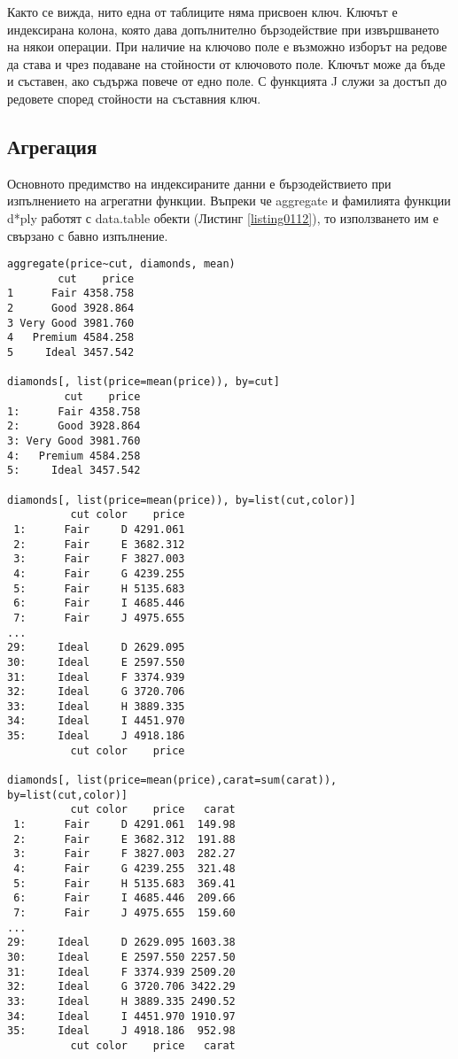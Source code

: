 Както се вижда, нито една от таблиците няма присвоен ключ. Ключът е индексирана колона, която дава допълнително бързодействие при извършването на някои операции. При наличие на ключово поле е възможно изборът на редове да става и чрез подаване на стойности от ключовото поле. Ключът може да бъде и съставен, ако съдържа повече от едно поле. С функцията J служи за достъп до редовете според стойности на съставния ключ. 

\subsection{Агрегация}

Основното предимство на индексираните данни е бързодействието при изпълнението на агрегатни функции. Въпреки че aggregate и фамилията функции d*ply работят с data.table обекти (Листинг \ref{listing0112}), то използването им е свързано с бавно изпълнение. 

\begin{lstlisting}[caption=Агрегатни функции, label=listing0112]
aggregate(price~cut, diamonds, mean)
        cut    price
1      Fair 4358.758
2      Good 3928.864
3 Very Good 3981.760
4   Premium 4584.258
5     Ideal 3457.542

diamonds[, list(price=mean(price)), by=cut]
         cut    price
1:      Fair 4358.758
2:      Good 3928.864
3: Very Good 3981.760
4:   Premium 4584.258
5:     Ideal 3457.542

diamonds[, list(price=mean(price)), by=list(cut,color)]
          cut color    price
 1:      Fair     D 4291.061
 2:      Fair     E 3682.312
 3:      Fair     F 3827.003
 4:      Fair     G 4239.255
 5:      Fair     H 5135.683
 6:      Fair     I 4685.446
 7:      Fair     J 4975.655
...
29:     Ideal     D 2629.095
30:     Ideal     E 2597.550
31:     Ideal     F 3374.939
32:     Ideal     G 3720.706
33:     Ideal     H 3889.335
34:     Ideal     I 4451.970
35:     Ideal     J 4918.186
          cut color    price

diamonds[, list(price=mean(price),carat=sum(carat)), by=list(cut,color)]
          cut color    price   carat
 1:      Fair     D 4291.061  149.98
 2:      Fair     E 3682.312  191.88
 3:      Fair     F 3827.003  282.27
 4:      Fair     G 4239.255  321.48
 5:      Fair     H 5135.683  369.41
 6:      Fair     I 4685.446  209.66
 7:      Fair     J 4975.655  159.60
...
29:     Ideal     D 2629.095 1603.38
30:     Ideal     E 2597.550 2257.50
31:     Ideal     F 3374.939 2509.20
32:     Ideal     G 3720.706 3422.29
33:     Ideal     H 3889.335 2490.52
34:     Ideal     I 4451.970 1910.97
35:     Ideal     J 4918.186  952.98
          cut color    price   carat
\end{lstlisting}

